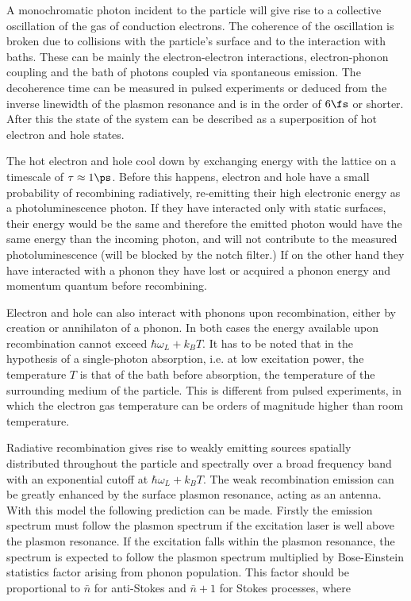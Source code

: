 \documentclass[journal=nalefd,manuscript=letter]{achemso}
\begin{document}
A monochromatic photon incident to the particle will give rise to a collective
oscillation of the gas of conduction electrons. The coherence of the oscillation
is broken due to collisions with the particle's surface and to the interaction
with baths. These can be mainly the electron-electron interactions,
electron-phonon coupling and the bath of photons coupled via spontaneous
emission. The decoherence time can be measured in pulsed experiments or
deduced from the inverse linewidth of the plasmon resonance and is in the order
of $6\fs$ or shorter. After this the state of the system can be described as a
superposition of hot electron and hole states. 

The hot electron and hole cool down by exchanging energy with the lattice on a
timescale of $\tau\approx1\ps$. Before this happens, electron and hole have a
small probability of recombining radiatively, re-emitting their high electronic
energy as a photoluminescence photon. If they have interacted only with static
surfaces, their energy would be the same and therefore the emitted photon would
have the same energy than the incoming photon, and will not contribute to the
measured photoluminescence (will be blocked by the notch filter.) If on the
other hand they have interacted with a phonon they have lost or acquired a
phonon energy and momentum quantum before recombining. 

Electron and hole can also interact with phonons upon recombination, either by
creation or annihilaton of a phonon. In both cases the energy available upon
recombination cannot exceed $\hbar\omega_L+k_BT$. It has to be noted that in the
hypothesis of a single-photon absorption, i.e. at low excitation power, the
temperature $T$ is that of the bath before absorption, the temperature of the
surrounding medium of the particle. This is different from pulsed experiments,
in which the electron gas temperature can be orders of magnitude higher than
room temperature. 

Radiative recombination gives rise to weakly emitting sources
spatially distributed throughout the particle and spectrally over a broad
frequency band with an exponential cutoff at $\hbar\omega_L+k_BT$. The
weak recombination emission can be greatly enhanced by the surface plasmon
resonance, acting as an antenna. With this model the following prediction can be
made. Firstly the emission spectrum must follow the plasmon spectrum if the
excitation laser is well above the plasmon resonance. If the excitation falls
within the plasmon resonance, the spectrum is expected to follow the plasmon
spectrum multiplied by Bose-Einstein statistics factor arising from phonon
population. This factor should be proportional to $\bar{n}$ for
anti-Stokes and $\bar{n}+1$ for Stokes processes, where
\end{document}
